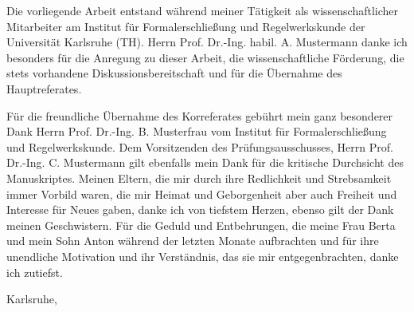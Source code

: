 
\ack

Die vorliegende Arbeit entstand während meiner Tätigkeit als wissenschaftlicher Mitarbeiter am Institut für Formalerschließung und Regelwerkskunde der Universität Karlsruhe (TH). Herrn Prof. Dr.-Ing. habil. A. Mustermann danke ich besonders für die Anregung zu dieser Arbeit, die wissenschaftliche Förderung, die stets vorhandene Diskussionsbereitschaft und für die Übernahme des Hauptreferates.

Für die freundliche Übernahme des Korreferates gebührt mein ganz besonderer Dank Herrn Prof. Dr.-Ing. B. Musterfrau vom Institut für Formalerschließung und Regelwerkskunde. Dem Vorsitzenden des Prüfungsausschusses, Herrn Prof. Dr.-Ing. C. Mustermann gilt ebenfalls mein Dank für die kritische Durchsicht des Manuskriptes. Meinen Eltern, die mir durch ihre Redlichkeit und Strebsamkeit immer Vorbild waren, die mir Heimat und Geborgenheit aber auch Freiheit und Interesse für Neues gaben, danke ich von tiefstem Herzen, ebenso gilt der Dank meinen Geschwistern. Für die Geduld und Entbehrungen, die meine Frau Berta und mein Sohn Anton während der letzten Monate aufbrachten und für ihre unendliche Motivation und ihr Verständnis, das sie mir entgegenbrachten, danke ich zutiefst.

\vspace{1cm}
\begin{flushright}\noindent
    Karlsruhe,\hfill {\it \myname}\\
    \releasemonth \hfill { }
\end{flushright}